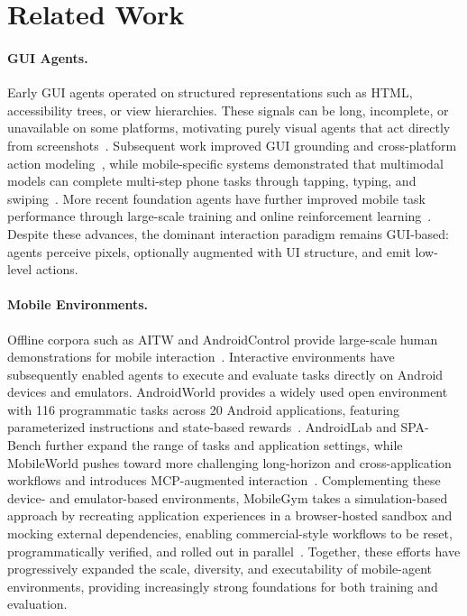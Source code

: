 \section{Related Work}
\label{sec:related}

\paragraph{GUI Agents.}
Early GUI agents operated on structured representations such as HTML, accessibility trees, or view hierarchies. These signals can be long, incomplete, or unavailable on some platforms, motivating purely visual agents that act directly from screenshots~\citep{cheng2024seeclick,hong2024cogagent}. Subsequent work improved GUI grounding and cross-platform action modeling~\citep{wu2025osatlas}, while mobile-specific systems demonstrated that multimodal models can complete multi-step phone tasks through tapping, typing, and swiping~\citep{yang2023appagent,wang2024mobileagent}. More recent foundation agents have further improved mobile task performance through large-scale training and online reinforcement learning~\citep{liu2024autoglm,qin2025uitars}. Despite these advances, the dominant interaction paradigm remains GUI-based: agents perceive pixels, optionally augmented with UI structure, and emit low-level actions. 

\paragraph{Mobile Environments.}
Offline corpora such as AITW and AndroidControl provide large-scale human demonstrations for mobile interaction~\citep{rawles2023aitw,li2024androidcontrol}. Interactive environments have subsequently enabled agents to execute and evaluate tasks directly on Android devices and emulators. AndroidWorld provides a widely used open environment with 116 programmatic tasks across 20 Android applications, featuring parameterized instructions and state-based rewards~\citep{rawles2025androidworld}. AndroidLab and SPA-Bench further expand the range of tasks and application settings, while MobileWorld pushes toward more challenging long-horizon and cross-application workflows and introduces MCP-augmented interaction~\citep{xu2025androidlab,chen2024spabench,kong2025mobileworld}. Complementing these device- and emulator-based environments, MobileGym takes a simulation-based approach by recreating application experiences in a browser-hosted sandbox and mocking external dependencies, enabling commercial-style workflows to be reset, programmatically verified, and rolled out in parallel~\citep{wu2026mobilegym}. Together, these efforts have progressively expanded the scale, diversity, and executability of mobile-agent environments, providing increasingly strong foundations for both training and evaluation.


